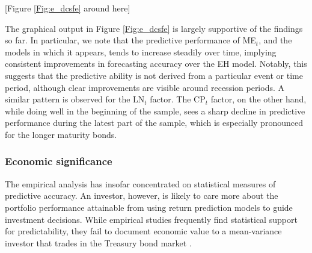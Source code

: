 \documentclass[12pt,letterpaper,leqno,doublespacing]{article}
\begin{document}
\begin{center}
    [Figure \ref{Fig:e_dcsfe} around here]
\end{center}

The graphical output in Figure \ref{Fig:e_dcsfe} is largely supportive of the findings so far. In particular, we note that the predictive performance of ME$_{t}$, and the models in which it appears, tends to increase steadily over time, implying consistent improvements in forecasting accuracy over the EH model. Notably, this suggests that the predictive ability is not derived from a particular event or time period, although clear improvements are visible around recession periods. A similar pattern is observed for the LN$_{t}$ factor. The CP$_{t}$ factor, on the other hand, while doing well in the beginning of the sample, sees a sharp decline in predictive performance during the latest part of the sample, which is especially pronounced for the longer maturity bonds.


\subsubsection{Economic significance}\label{Sec:e_economic_evaluation}
The empirical analysis has insofar concentrated on statistical measures of predictive accuracy. An investor, however, is likely to care more about the portfolio performance attainable from using return prediction models to guide investment decisions. While empirical studies frequently find statistical support for predictability, they fail to document economic value to a mean-variance investor that trades in the Treasury bond market \citep{ThorntonValente2012,SarnoSchneiderWagner2014}. 
\end{document}
